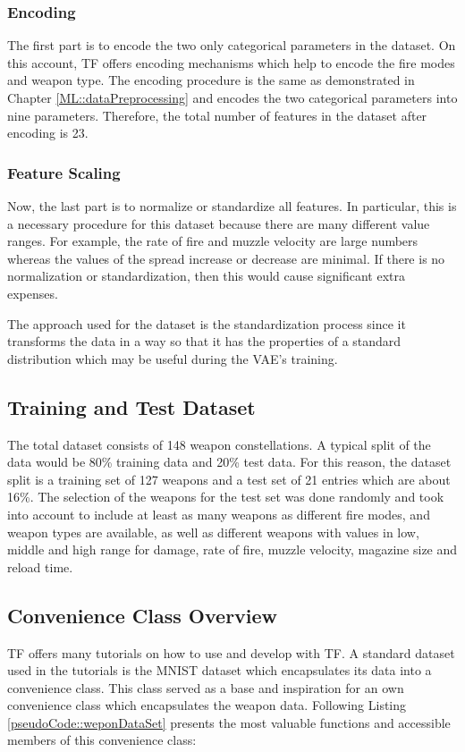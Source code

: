 \documentclass[MGS,Master,english]{twbook}%
\begin{document}
\subsubsection{Encoding}
The first part is to encode the two only categorical parameters in the dataset. On this account, TF offers encoding mechanisms which help to encode the fire modes and weapon type. The encoding procedure is the same as demonstrated in Chapter \ref{ML::dataPreprocessing} and encodes the two categorical parameters into nine parameters. Therefore, the total number of features in the dataset after encoding is 23.

\subsubsection{Feature Scaling}
Now, the last part is to normalize or standardize all features. In particular, this is a necessary procedure for this dataset because there are many different value ranges. For example, the rate of fire and muzzle velocity are large numbers whereas the values of the spread increase or decrease are minimal. If there is no normalization or standardization, then this would cause significant extra expenses.

The approach used for the dataset is the standardization process since it transforms the data in a way so that it has the properties of a standard distribution which may be useful during the VAE's training. 

\subsection{Training and Test Dataset}
The total dataset consists of 148 weapon constellations. A typical split of the data would be 80\% training data and 20\% test data. For this reason, the dataset split is a training set of 127 weapons and a test set of 21 entries which are about 16\%. The selection of the weapons for the test set was done randomly and took into account to include at least as many weapons as different fire modes, and weapon types are available, as well as different weapons with values in low, middle and high range for damage, rate of fire, muzzle velocity, magazine size and reload time.

\subsection{Convenience Class Overview}
TF offers many tutorials on how to use and develop with TF. A standard dataset used in the tutorials is the MNIST dataset which encapsulates its data into a convenience class. This class served as a base and inspiration for an own convenience class which encapsulates the weapon data. Following Listing \ref{pseudoCode::weponDataSet} presents the most valuable functions and accessible members of this convenience class:
\end{document}
